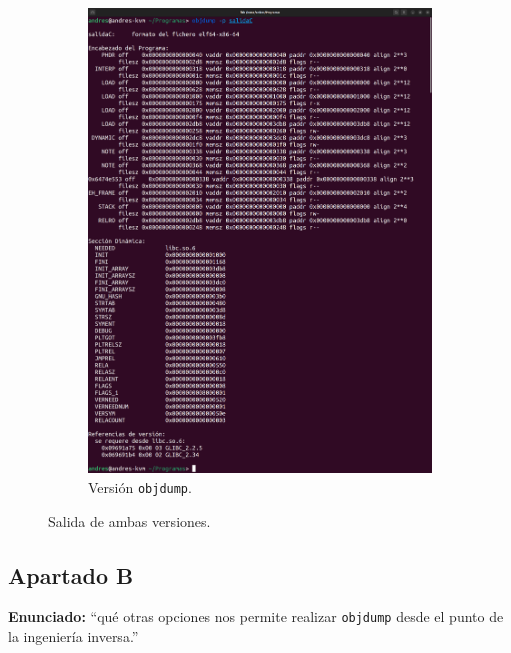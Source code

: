 \documentclass{article}
\begin{document}
\begin{itemize}
\begin{figure}[H]
\begin{subfigure}{0.49\textwidth}
            \includegraphics[width=\textwidth]{imagenes/mergedobjdumpp}
            \caption{Versión \texttt{objdump}.}
        \end{subfigure}
        \caption{Salida de ambas versiones.}
    \end{figure}    

\end{itemize}


{}
\subsection*{Apartado B}

\textbf{Enunciado: }``qué otras opciones nos permite realizar \texttt{objdump} desde el punto de la ingeniería inversa.''
\end{document}
